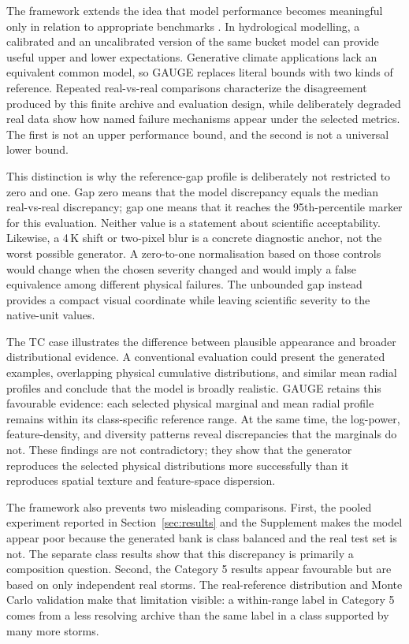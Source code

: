 \documentclass[gmd, manuscript]{copernicus}
\begin{document}
The framework extends the idea that model performance becomes meaningful only in
relation to appropriate benchmarks \citep{Seibert2018}. In hydrological modelling, a
calibrated and an uncalibrated version of the same bucket model can provide useful
upper and lower expectations. Generative climate applications lack an equivalent
common model, so GAUGE replaces literal bounds with two kinds of reference. Repeated
real-vs-real comparisons characterize the disagreement produced by this finite
archive and evaluation design, while deliberately degraded real data show how named
failure mechanisms appear under the selected metrics. The first is not an upper
performance bound, and the second is not a universal lower bound.

This distinction is why the reference-gap profile is deliberately not restricted to
zero and one. Gap zero means that the model discrepancy equals the median
real-vs-real discrepancy; gap one means that it reaches the 95th-percentile marker for this
evaluation. Neither value is a statement about scientific acceptability. Likewise, a
4\,K shift or two-pixel blur is a concrete diagnostic anchor, not the worst possible
generator. A zero-to-one normalisation based on those controls would change when the
chosen severity changed and would imply a false equivalence among different physical
failures. The unbounded gap instead provides a compact visual coordinate while leaving
scientific severity to the native-unit values.

The TC case illustrates the difference between plausible appearance and broader
distributional evidence. A conventional evaluation could present the generated
examples, overlapping physical cumulative distributions, and similar mean radial
profiles and conclude that the model is broadly realistic. GAUGE retains this
favourable evidence: each selected physical marginal and mean radial profile remains
within its class-specific reference range. At the same time, the log-power,
feature-density, and diversity patterns reveal discrepancies that the marginals do
not. These findings are not contradictory; they show that the generator reproduces
the selected physical distributions more successfully than it reproduces spatial
texture and feature-space dispersion.

The framework also prevents two misleading comparisons. First, the pooled experiment
reported in Section~\ref{sec:results} and the Supplement makes the model
appear poor because the generated bank is class balanced and the real test set is not.
The separate class results show that this discrepancy is primarily a composition
question. Second, the Category 5 results appear favourable but are based
on only \CfiveStorms{} independent real storms. The real-reference distribution and
Monte Carlo validation make that limitation visible: a within-range label in Category
5 comes from a less resolving archive than the same label in a class supported by
many more storms.
\end{document}
